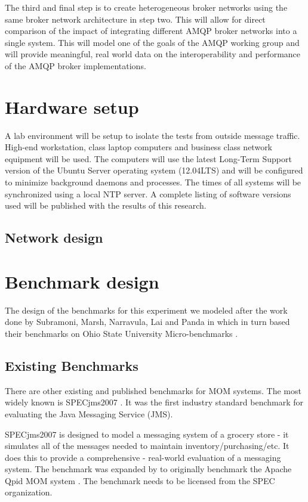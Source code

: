 \documentclass{thesis}
\begin{document}
The third and final step is to create heterogeneous broker networks using the same broker network architecture in step two.  This will allow for direct comparison of the impact of integrating different AMQP broker networks into a single system.  This will model one of the goals of the AMQP working group and will provide meaningful, real world data on the interoperability and performance of the AMQP broker implementations. 



\section{Hardware setup}
A lab environment will be setup to isolate the tests from outside message traffic.  High-end workstation, class laptop computers and business class network equipment will be used.  The computers will use the latest Long-Term Support version of the Ubuntu Server operating system (12.04LTS) and will be configured to minimize background daemons and processes.  The times of all systems will be synchronized using a local NTP server. A complete listing of software versions used will be published with the results of this research.

\subsection{Network design}


\section{Benchmark design}

The design of the benchmarks for this experiment we modeled after the work done by Subramoni, Marsh, Narravula, Lai and Panda in \cite{Subramoni} which in turn based their benchmarks on Ohio State University Micro-benchmarks \cite{OSU_MICRO_BENCHMARKS}.

\subsection{Existing Benchmarks}
There are other existing and published benchmarks for MOM systems.  The most widely known is SPECjms2007 \cite{SPEC_JMS2007}.  It was the first industry standard benchmark for evaluating the Java Messaging Service (JMS).

SPECjms2007 is designed to model a messaging system of a grocery store - it simulates all of the messages needed to maintain inventory/purchasing/etc.  It does this to provide a comprehensive - real-world evaluation of a messaging system.  The benchmark was expanded by  to originally benchmark the Apache Qpid MOM system \cite{citation needed}.  The benchmark needs to be licensed from the SPEC organization.  
\end{document}
